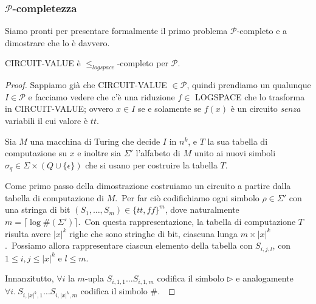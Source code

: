 \subsubsection{$\mathcal{P}$-completezza}

Siamo pronti per presentare formalmente il primo problema $\mathcal{P}$-completo e a dimostrare che lo è davvero.

\begin{theorem}
    \label{CircVal_P-completo}
    \hfill

    {\footnotesize CIRCUIT-VALUE} è $\leqslant_{\mathit{logspace}}$-completo per $\mathcal{P}$.
\end{theorem}

\begin{proof}

    Sappiamo già che {\footnotesize CIRCUIT-VALUE} $\in \mathcal{P}$, quindi prendiamo un qualunque $I \in \mathcal{P}$ e facciamo vedere che c'è una riduzione $f \in$ LOGSPACE che lo trasforma in {\footnotesize CIRCUIT-VALUE}; ovvero $x \in I$ se e solamente se $f(x)$ è un circuito \textit{senza} variabili il cui valore è $\mathit{tt}$.\

    \medskip
    \noindent Sia $M$ una macchina di Turing che decide $I$ in $n^k$, e $T$ la sua tabella di computazione su $x$ e inoltre sia $\Sigma'$ l'alfabeto di $M$ unito ai nuovi simboli $\sigma_q \in \Sigma \times (Q \cup \{\epsilon\})$ che si usano per costruire la tabella $T$.\

    Come primo passo della dimostrazione costruiamo un circuito a partire dalla tabella di computazione di $M$.\
    Per far ciò codifichiamo ogni simbolo $\rho \in \Sigma'$ con una stringa di bit $(S_1,\dots,S_m) \in \{\mathit{tt},\mathit{ff}\}^m$, dove naturalmente $m = \lceil \log\#(\Sigma') \rceil$.\
    Con questa rappresentazione, la tabella di computazione $T$ risulta avere $|x|^k$ righe che sono stringhe di bit, ciascuna lunga $m \times |x|^k$.\
    Possiamo allora rappresentare ciascun elemento della tabella con $S_{i,j,l}$, con $1 \leq i,j \leq |x|^k$ e $l \leq m$.\

    Innanzitutto, $\forall i$ la $m$-upla $S_{i,1,1}\dots S_{i,1,m}$ codifica il simbolo $\triangleright$ e analogamente $\forall i.\ S_{i,|x|^k,1}\dots S_{i,|x|^k,m}$ codifica il simbolo $\#$.\


\end{proof}
